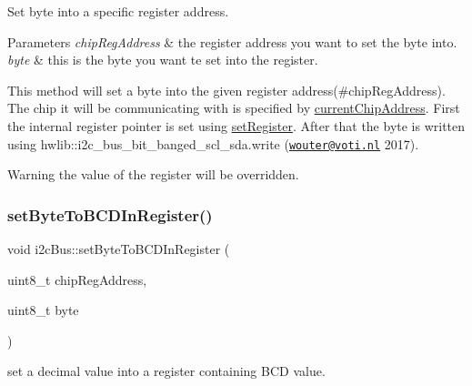 Set byte into a specific register address. 


\begin{DoxyParams}{Parameters}
{\em chip\+Reg\+Address} & the register address you want to set the byte into. \\
\hline
{\em byte} & this is the byte you want te set into the register.\\
\hline
\end{DoxyParams}
This method will set a byte into the given register address(\#chip\+Reg\+Address). The chip it will be communicating with is specified by \mbox{\hyperlink{classi2c_bus_a64ff87527c88619d72ede947d73eac3a}{current\+Chip\+Address}}. First the internal register pointer is set using \mbox{\hyperlink{classi2c_bus_adee2545c8b692474b6814b4605e48ec3}{set\+Register}}. After that the byte is written using hwlib\+::i2c\+\_\+bus\+\_\+bit\+\_\+banged\+\_\+scl\+\_\+sda.\+write (\href{mailto:wouter@voti.nl}{\tt wouter@voti.\+nl} 2017). \begin{DoxyWarning}{Warning}
the value of the register will be overridden. 
\end{DoxyWarning}
\mbox{\label{classi2c_bus_a31c36069cff15f73aa54703a6ee8b951}} 
\subsubsection{\texorpdfstring{set\+Byte\+To\+B\+C\+D\+In\+Register()}{setByteToBCDInRegister()}}
{\footnotesize\ttfamily void i2c\+Bus\+::set\+Byte\+To\+B\+C\+D\+In\+Register (\begin{DoxyParamCaption}\item[{uint8\+\_\+t}]{chip\+Reg\+Address,  }\item[{uint8\+\_\+t}]{byte }\end{DoxyParamCaption})}



set a decimal value into a register containing B\+CD value. 


